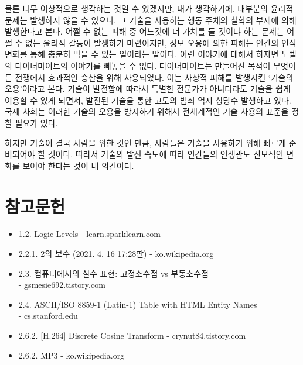 \documentclass{article}
\begin{document}
물론 너무 이상적으로 생각하는 것일 수 있겠지만, 내가 생각하기에, 대부분의 윤리적 문제는 발생하지
않을 수 있으나, 그 기술을 사용하는 행동 주체의 철학의 부재에 의해 발생한다고 본다.
어쩔 수 없는 피해 중 어느것에 더 가치를 둘 것이냐 하는 문제는 어쩔 수 없는 윤리적 갈등이 발생하기
마련이지만, 정보 오용에 의한 피해는 인간의 인식 변화를 통해 충분히 막을 수 있는 일이라는 말이다.
이런 이야기에 대해서 하자면 노벨의 다이너마이트의 이야기를 빼놓을 수 없다.
다이너마이트는 만들어진 목적이 무엇이든 전쟁에서 효과적인 승산을 위해 사용되었다. 이는 사상적 피해를
발생시킨 `기술의 오용'이라고 본다.
기술이 발전함에 따라서 특별한 전문가가 아니더라도 기술을 쉽게 이용할 수 있게 되면서,
발전된 기술을 통한 고도의 범죄 역시 상당수 발생하고 있다.
국제 사회는 이러한 기술의 오용을 방지하기 위해서 전세계적인 기술 사용의 표준을 정할 필요가 있다.

하지만 기술이 결국 사람을 위한 것인 만큼, 사람들은 기술을 사용하기 위해 빠르게 준비되어야 할 것이다.
따라서 기술의 발전 속도에 따라 인간들의 인생관도 진보적인 변화를 보여야 한다는 것이 내 의견이다.

\section{참고문헌}

\begin{itemize}
    \item 1.2. Logic Levels - learn.sparklearn.com
    \item 2.2.1. 2의 보수 (2021. 4. 16 17:28판) - ko.wikipedia.org
    \item 2.3. 컴퓨터에서의 실수 표현: 고정소수점 vs 부동소수점 \\- gsmesie692.tistory.com
    \item 2.4. ASCII/ISO 8859-1 (Latin-1) Table with HTML Entity Names \\- cs.stanford.edu
    \item 2.6.2. [H.264] Discrete Cosine Transform - crynut84.tistory.com
    \item 2.6.2. MP3 - ko.wikipedia.org
\end{itemize}
\end{document}
